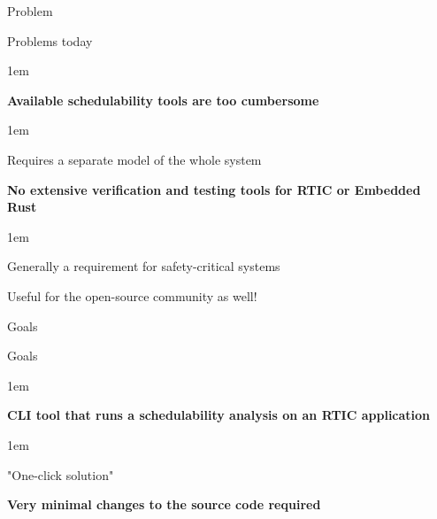 \begin{frame}{Problem}
    \begin{block}{Problems today}
        \begin{itemize-size}{1em}
            \item \textbf{Available schedulability tools are too cumbersome}
                \begin{itemize-size}{1em}
                    \item Requires a separate model of the whole system
                \end{itemize-size}
            \item \textbf{No extensive verification and testing tools for RTIC or Embedded Rust}
                \begin{itemize-size}{1em}
                    \item Generally a requirement for safety-critical systems
                    \item Useful for the open-source community as well!
                \end{itemize-size}
        \end{itemize-size}
    \end{block}
\end{frame}

\begin{frame}{Goals}
    \begin{block}{Goals}
        \begin{itemize-size}{1em}
            \item \textbf{CLI tool that runs a schedulability analysis on an RTIC application}
                \begin{itemize-size}{1em}
                    \item "One-click solution" 
                \end{itemize-size}
            \item \textbf{Very minimal changes to the source code required}
        \end{itemize-size}          
    \end{block}
\end{frame}

